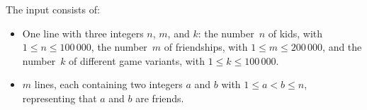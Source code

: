 

The input consists of:
\begin{itemize}
  \item
    One line with three integers $n$, $m$, and $k$:
    the number~$n$ of kids, with $1 \leq n \leq 100\,000$,
    the number~$m$ of friendships, with $1 \leq m \leq 200\,000$,
    and the number~$k$ of different game variants, with  $1 \leq k \leq 100\,000$.
  \item
  $m$ lines, each containing two integers $a$ and $b$ with $1\leq a < b \leq n$, representing that $a$ and $b$ are friends.
\end{itemize}

